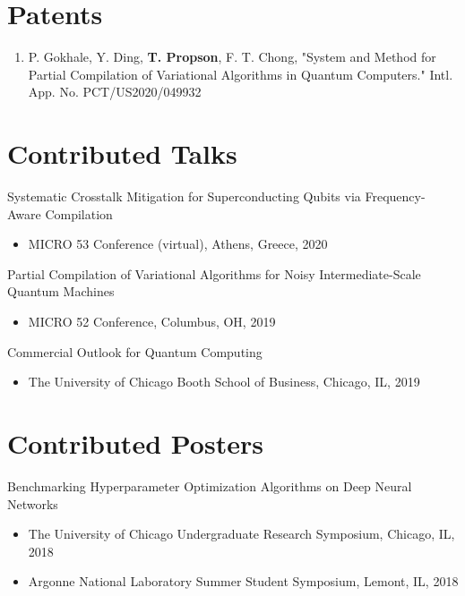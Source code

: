 \documentclass[letterpaper, 11pt]{article}
\begin{document}
\section{Patents}
\begin{enumerate}
  \item P. Gokhale, Y. Ding, \textbf{T. Propson}, F. T. Chong, "System and Method
    for Partial Compilation of Variational Algorithms in Quantum Computers." Intl. App. No. PCT/US2020/049932
\end{enumerate}

\section{Contributed Talks}
Systematic Crosstalk Mitigation for Superconducting Qubits via Frequency-Aware Compilation\\
\begin{itemize}
  \item MICRO 53 Conference (virtual), Athens, Greece, 2020\\
\end{itemize}
Partial Compilation of Variational Algorithms for Noisy Intermediate-Scale Quantum Machines\\
\begin{itemize}
\item MICRO 52 Conference, Columbus, OH, 2019\\
\end{itemize}
Commercial Outlook for Quantum Computing\\
\begin{itemize}
\item The University of Chicago Booth School of Business, Chicago, IL, 2019\\
\end{itemize}

\section{Contributed Posters}
Benchmarking Hyperparameter Optimization Algorithms on Deep Neural Networks\\
\begin{itemize}
\item The University of Chicago Undergraduate Research Symposium, Chicago, IL, 2018\\
\item Argonne National Laboratory Summer Student Symposium, Lemont, IL, 2018\\
\end{itemize}
\end{document}
